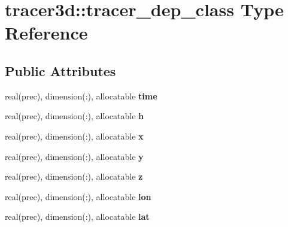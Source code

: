 \hypertarget{structtracer3d_1_1tracer__dep__class}{}\section{tracer3d\+:\+:tracer\+\_\+dep\+\_\+class Type Reference}
\label{structtracer3d_1_1tracer__dep__class}
\subsection*{Public Attributes}
\begin{DoxyCompactItemize}
\item 
\mbox{\label{structtracer3d_1_1tracer__dep__class_a0ff57f50a335e245c2a7b37b4b6f27b5}} 
real(prec), dimension(\+:), allocatable {\bfseries time}
\item 
\mbox{\label{structtracer3d_1_1tracer__dep__class_a717aeb47146fd7af90eb4a19a36f925d}} 
real(prec), dimension(\+:), allocatable {\bfseries h}
\item 
\mbox{\label{structtracer3d_1_1tracer__dep__class_ad8c69db37dfd9db720c53bb6764842c5}} 
real(prec), dimension(\+:), allocatable {\bfseries x}
\item 
\mbox{\label{structtracer3d_1_1tracer__dep__class_a414a5a1630400d24ae0e53444b1ce6b2}} 
real(prec), dimension(\+:), allocatable {\bfseries y}
\item 
\mbox{\label{structtracer3d_1_1tracer__dep__class_ab7fc71bff2efc5ffcbfbe1e6e118e270}} 
real(prec), dimension(\+:), allocatable {\bfseries z}
\item 
\mbox{\label{structtracer3d_1_1tracer__dep__class_aa4961c950509149eae12e72882da7b97}} 
real(prec), dimension(\+:), allocatable {\bfseries lon}
\item 
\mbox{\label{structtracer3d_1_1tracer__dep__class_a6b2d5c6a9bc8e11b0237fca79a21c62e}} 
real(prec), dimension(\+:), allocatable {\bfseries lat}
\item 

\end{DoxyCompactItemize}
